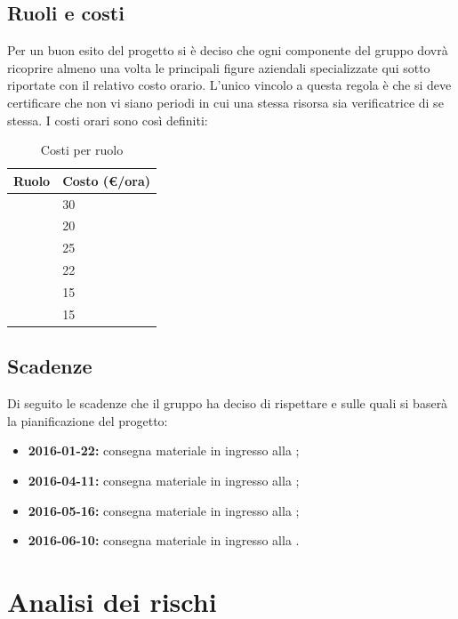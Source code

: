 \documentclass[12pt,a4paper]{article}
\begin{document}
\subsection{Ruoli e costi}
Per un buon esito del progetto si è deciso che ogni componente del gruppo dovrà ricoprire almeno una volta le principali figure aziendali specializzate qui sotto riportate con il relativo costo orario. L'unico vincolo a questa regola è che si deve certificare che non vi siano periodi in cui una stessa risorsa sia verificatrice di se stessa. I costi orari sono così definiti:
\begin{table}[H]
	\begin{center}
		\begin{tabular}{p{} p{}}
			\toprule
			\textbf{Ruolo} &  \textbf{Costo (\euro/ora)} \\
			\midrule
			\midrule
			\RE &  30 \\
			\midrule
			\AM & 20 \\
			\midrule
			\AN & 25 \\
			\midrule
			\PG & 22 \\
			\midrule
			\PR & 15 \\
			\midrule
			\VR & 15  \\
			\bottomrule
		\end{tabular}
		\caption{Costi per ruolo}
	\end{center}
\end{table}

\subsection{Scadenze}
Di seguito le scadenze che il gruppo \nomeGruppo{} ha deciso di rispettare e sulle quali si baserà la pianificazione del progetto:
\begin{itemize}
	\item \textbf{2016-01-22:} consegna materiale in ingresso alla \RR;
	\item \textbf{2016-04-11:} consegna materiale in ingresso alla  \RP;
	\item \textbf{2016-05-16:} consegna materiale in ingresso alla \RQ;
	\item \textbf{2016-06-10:} consegna materiale in ingresso alla \RA.
\end{itemize}

\newpage

\section{Analisi dei rischi}
\end{document}
